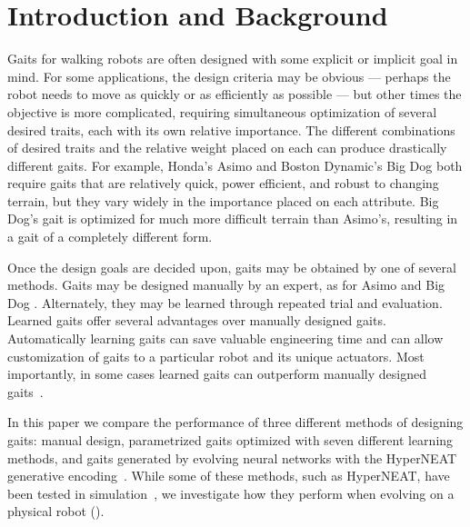 \section{Introduction and Background}



Gaits for walking robots are often designed with some explicit or
implicit goal in mind.  For some applications, the design criteria may
be obvious --- perhaps the robot needs to move as quickly or as
efficiently as possible --- but other times the objective is more complicated,
requiring simultaneous optimization of several desired traits, each
with its own relative importance.  The different combinations of desired traits and the relative weight placed on each can produce drastically different gaits.    For example, Honda's Asimo
\cite{chestnutt2006footstep} and Boston Dynamic's Big Dog \cite{raibert2008bigdog} both require
gaits that are relatively quick, power efficient, and robust to
changing terrain, but they vary widely in the importance placed
on each attribute.  Big Dog's gait is optimized for much more difficult terrain than Asimo's, resulting in a gait of a completely different form.

Once the design goals are decided upon, gaits may be obtained by one of several methods.  Gaits may be designed manually by an expert, as for Asimo and Big Dog \cite{chestnutt2006footstep, raibert2008bigdog}.  Alternately, they may be learned through repeated trial and evaluation.  Learned gaits offer several advantages over manually designed gaits.  Automatically learning gaits can save valuable engineering time and can allow customization of gaits to a particular robot and its unique actuators.  Most importantly, in some cases learned gaits can outperform manually designed gaits~\cite{hornby2005autonomous, valsalam2008modular}.

In this paper we compare the performance of three different methods of designing gaits: manual design, parametrized gaits optimized with seven different learning methods, and gaits generated by evolving neural networks with the HyperNEAT generative encoding~\cite{stanley2009hypercube}. While some of these methods, such as HyperNEAT, have been tested in simulation~\cite{clune2009evolving, clune2011performance}, we investigate how they perform when evolving on a physical robot (). 

